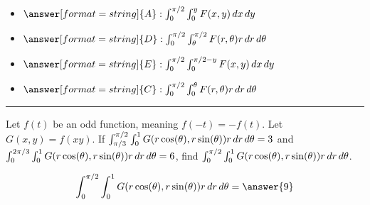 \documentclass{ximera}
\begin{document}
\begin{problem}
  \begin{itemize}
    \item[] $\answer[format=string]{A}: \int_0^{\pi/2} \int_{0}^{y}F(x,y) \d x\d y$
    \item[] $\answer[format=string]{D}: \int_0^{\pi/2} \int_{\theta}^{\pi/2}F(r,\theta)r \d r\d\theta$
    \item[] $\answer[format=string]{E}: \int_0^{\pi/2} \int_{0}^{\pi/2-y}F(x,y) \d x\d y$
    \item[] $\answer[format=string]{C}: \int_0^{\pi/2} \int_0^{\theta}F(r,\theta)r \d r\d \theta$
    \pdfOnly{\end{multicols}}
  \end{itemize}
\end{problem}

\hrule

\begin{problem}
  Let $f(t)$ be an odd function, meaning $f(-t) = -f(t)$. Let $G(x,y)
  = f(xy)$. If $\int_{\pi/3}^{\pi/2} \int_0^1 G(r \cos(\theta),r\sin(\theta))r\mathop{}\!d r\mathop{}\!d\theta = 3$ and $\int_{0}^{2\pi/3} \int_0^1 G(r \cos(\theta),r\sin(\theta))r\mathop{}\!d r\mathop{}\!d\theta = 6$, find  $\int_{0}^{\pi/2} \int_0^1 G(r \cos(\theta),r\sin(\theta))r\mathop{}\!d r\mathop{}\!d\theta$.
  \begin{prompt}
  \[
  \int_{0}^{\pi/2} \int_0^1 G(r \cos(\theta),r\sin(\theta))r\d r\d\theta = \answer{9}
  \]
  \end{prompt}
\end{problem}

\vfill
\end{document}
